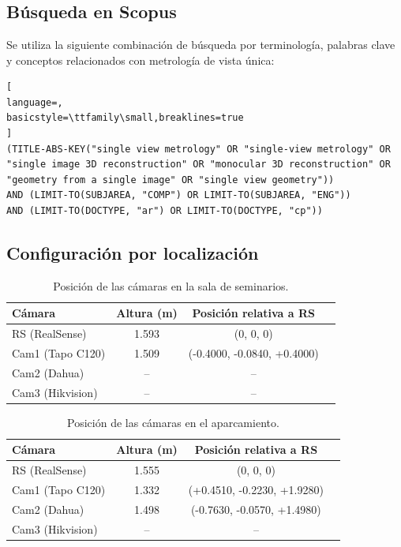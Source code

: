 \chapter{}
\section{Búsqueda en Scopus}
Se utiliza la siguiente combinación de búsqueda por terminología, palabras clave y conceptos relacionados con metrología de vista única:
\begin{lstlisting}[
language=,
basicstyle=\ttfamily\small,breaklines=true
]
(TITLE-ABS-KEY("single view metrology" OR "single-view metrology" OR "single image 3D reconstruction" OR "monocular 3D reconstruction" OR "geometry from a single image" OR "single view geometry"))
AND (LIMIT-TO(SUBJAREA, "COMP") OR LIMIT-TO(SUBJAREA, "ENG"))
AND (LIMIT-TO(DOCTYPE, "ar") OR LIMIT-TO(DOCTYPE, "cp"))
\end{lstlisting}

\section{Configuración por localización}\label{app:LocationConfig}
\begin{table}[!ht]
\scriptsize
\centering
\begin{tabular}{|l|c|c|c|}
\hline
\rowcolor[HTML]{FFCB2F}
\textbf{Cámara} & \textbf{Altura (m)} & \textbf{Posición relativa a RS} \\
\hline
RS (RealSense) & 1.593 & (0, 0, 0) \\
\hline
Cam1 (Tapo C120) & 1.509 & (-0.4000, -0.0840, +0.4000) \\
\hline
Cam2 (Dahua) & -- & -- \\
\hline
Cam3 (Hikvision) & -- & -- \\
\hline
\end{tabular}
\caption{Posición de las cámaras en la sala de seminarios.}\label{tab:SeminarRoom}
\end{table}

\begin{table}[!ht]
\centering
\scriptsize
\begin{tabular}{|l|c|c|c|}
\hline
\rowcolor[HTML]{FFCB2F}
\textbf{Cámara} & \textbf{Altura (m)} & \textbf{Posición relativa a RS} \\
\hline
RS (RealSense) & 1.555 & (0, 0, 0) \\
\hline
Cam1 (Tapo C120) & 1.332 & (+0.4510, -0.2230, +1.9280) \\
\hline
Cam2 (Dahua) & 1.498 & (-0.7630, -0.0570, +1.4980) \\
\hline
Cam3 (Hikvision) & -- & -- \\
\hline
\end{tabular}
\caption{Posición de las cámaras en el aparcamiento.}\label{tab:ParkingLot}
\end{table}

